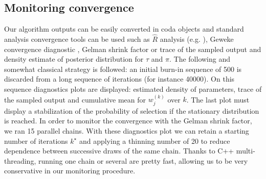 \documentclass[journal]{IEEEtran}
\begin{document}
\subsection*{Monitoring convergence}
Our algorithm outputs can be easily converted in coda objects
\cite{coda} and standard analysis convergence tools can be used such
as $\hat R$ analysis (e.g. \cite{bayesiandataanalysis}), Geweke
convergence diagnostic \cite{gewekediagnostic}, Gelman shrink factor
\cite{bayesiandataanalysis} or trace of the sampled output and density
estimate of posterior distribution for $\tau$ and $\pi$. The following
and somewhat classical strategy is followed: an initial burn-in
sequence of 500 is discarded from a long sequence of iterations (for
instance 40000). On this sequence diagnostics plots are displayed:
estimated density of parameters, trace of the sampled output and
cumulative mean for $w_j^{(k)}$ over $k$. The last plot must display a
stabilization of the probability of selection if the stationary
distribution is reached. In order to monitor the convergence with the
Gelman shrink factor, we ran 15 parallel chains.  With these
diagnostics plot we can retain a starting number of iterations
$k^\star$ and applying a thinning number of 20 to reduce dependence
between successive draws of the same chain. Thanks to C++
multi-threading, running one chain or several are pretty fast,
allowing us to be very conservative in our monitoring procedure.
\end{document}
